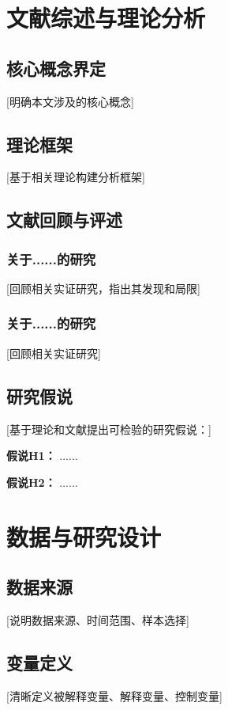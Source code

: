 \documentclass[UTF8, a4paper, 12pt]{ctexart}
\numberwithin{equation}{section}
\begin{document}
\section{文献综述与理论分析}

\subsection{核心概念界定}
[明确本文涉及的核心概念]

\subsection{理论框架}
[基于相关理论构建分析框架]

\subsection{文献回顾与评述}

\subsubsection{关于......的研究}
[回顾相关实证研究，指出其发现和局限]

\subsubsection{关于......的研究}
[回顾相关实证研究]

\subsection{研究假说}
[基于理论和文献提出可检验的研究假说：]

\textbf{假说H1：} ......

\textbf{假说H2：} ......

\section{数据与研究设计}

\subsection{数据来源}
[说明数据来源、时间范围、样本选择]

\subsection{变量定义}
[清晰定义被解释变量、解释变量、控制变量]
\end{document}
